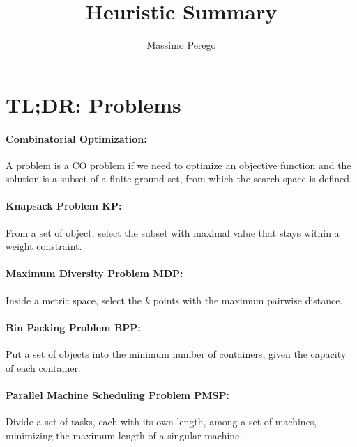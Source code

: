 \documentclass{article}
\title{Heuristic Summary}
\author{Massimo Perego}
\date{}
\begin{document}
	
	\maketitle
	
	\tableofcontents
	
	\newpage
	
	\section*{TL;DR: Problems}
	
	\paragraph{Combinatorial Optimization:} A problem is a CO problem if we need to optimize an objective function and the solution is a subset of a finite ground set, from which the search space is defined.\\
	
	
	
	\paragraph{Knapsack Problem KP:} From a set of object, select the subset with maximal value that stays within a weight constraint.\\
	
	\paragraph{Maximum Diversity Problem MDP:} Inside a metric space, select the $k$ points with the maximum pairwise distance.\\
	
	\paragraph{Bin Packing Problem BPP:} Put a set of objects into the minimum number of containers, given the capacity of each container.\\
	
	\paragraph{Parallel Machine Scheduling Problem PMSP:} Divide a set of tasks, each with its own length, among a set of machines, minimizing the maximum length of a singular machine.\\
	
\end{document}
